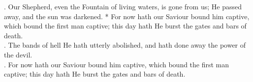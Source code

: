 \begin{Parallel}[v]{\colw}{\colx}
{{\Rbar. Our Shepherd, even the Fountain of living waters, is gone from us; He passed away, and the sun was darkened.
* For now hath our Saviour bound him captive, which bound the first man captive; this day hath He burst the gates and bars of death.\\
\Vbar. The bands of hell He hath utterly abolished, and hath done away the power of the devil.\\
\Rbar. For now hath our Saviour bound him captive, which bound the first man captive; this day hath He burst the gates and bars of death.}}

\end{Parallel}
